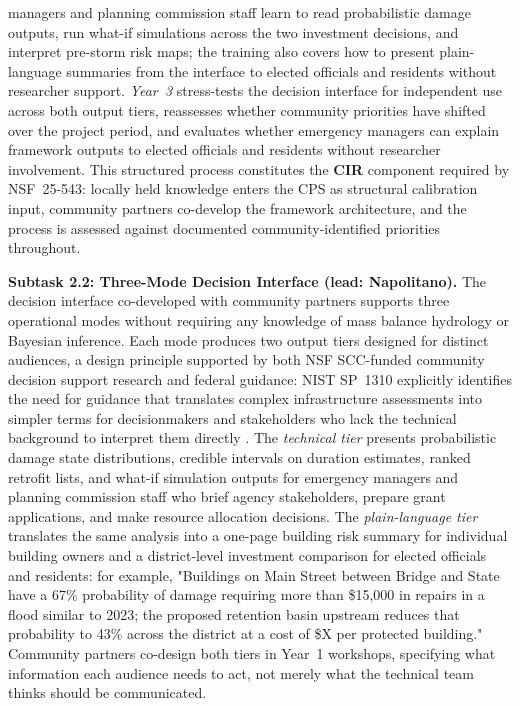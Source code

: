 \documentclass[11pt]{article}
\begin{document}
managers and planning commission staff learn to read probabilistic damage outputs,
run what-if simulations across the two investment decisions, and interpret pre-storm
risk maps; the training also covers how to present plain-language summaries from the
interface to elected officials and residents without researcher support.
\textit{Year~3} stress-tests the decision interface for independent use across both
output tiers, reassesses whether community priorities have shifted over the project
period, and evaluates whether emergency managers can explain framework outputs to
elected officials and residents without researcher involvement.
This structured process constitutes the \textbf{CIR} component required by NSF~25-543:
locally held knowledge enters the CPS as structural calibration input, community
partners co-develop the framework architecture, and the process is assessed against
documented community-identified priorities throughout.

\textbf{Subtask 2.2: Three-Mode Decision Interface (lead: Napolitano).}
The decision interface co-developed with community partners supports three operational
modes without requiring any knowledge of mass balance hydrology or Bayesian inference.
Each mode produces two output tiers designed for distinct audiences, a design principle
supported by both NSF SCC-funded community decision support research
\cite{skilton2022dontwant,habib2023anchoring} and federal guidance: NIST SP~1310 explicitly identifies
the need for guidance that translates complex infrastructure assessments into simpler
terms for decisionmakers and stakeholders who lack the technical background to interpret
them directly \cite[Sec.~6.1.7.4]{davis2024nist}.
The \textit{technical tier} presents probabilistic damage state distributions,
credible intervals on duration estimates, ranked retrofit lists, and what-if
simulation outputs for emergency managers and planning commission staff who brief
agency stakeholders, prepare grant applications, and make resource allocation
decisions.
The \textit{plain-language tier} translates the same analysis into a one-page
building risk summary for individual building owners and a district-level investment
comparison for elected officials and residents: for example, "Buildings on Main Street
between Bridge and State have a 67\% probability of damage requiring more than
\$15,000 in repairs in a flood similar to 2023; the proposed retention basin upstream
reduces that probability to 43\% across the district at a cost of \$X per protected
building."
Community partners co-design both tiers in Year~1 workshops, specifying what
information each audience needs to act, not merely what the technical team thinks
should be communicated.
\end{document}
